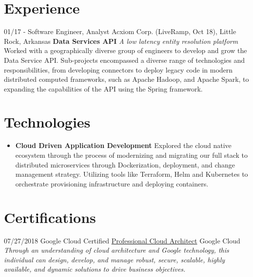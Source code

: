 \documentclass[]{friggeri-cv}
\begin{document}
\section{Experience}
\begin{entrylist}
  \entry
    {01/17 - }
    {Software Engineer, Analyst}
    {Acxiom Corp. (LiveRamp, Oct 18), Little Rock, Arkansas}
    {\textbf{Data Services API} \textit{A low latency entity resolution platform} Worked with a geographically diverse group of engineers to develop and grow the Data Service API. Sub-projects encompassed a diverse range of technologies and responsibilities, from developing connectors to deploy legacy code in modern distributed computed frameworks, such as Apache Hadoop, and Apache Spark, to expanding the capabilities of the API using the Spring framework. }
\end{entrylist}

\section{Technologies}
\begin{itemize}
    \item
      {\textbf{Cloud Driven Application Development} Explored the cloud native ecosystem through the process of modernizing and migrating our full stack to distributed microservices through Dockerization, deployment, and change management strategy. Utilizing tools like Terraform, Helm and Kubernetes to orchestrate provisioning infrastructure and deploying containers. }
\end{itemize}

\section{Certifications}
\begin{entrylist}
 \entry
   {07/27/2018}
   {Google Cloud Certified \href{https://www.credential.net/nwr1hwwq?key=22e8d9d6b741e6ba83b36d6912d092d5bcda893c26b970eed35f9a70da86a45e}{Professional Cloud Architect}}
   {Google Cloud}
   {\textit{Through an understanding of cloud architecture and Google technology, this individual can design, develop, and manage robust, secure, scalable, highly available, and dynamic solutions to drive business objectives.}}
\end{entrylist}
\end{document}
